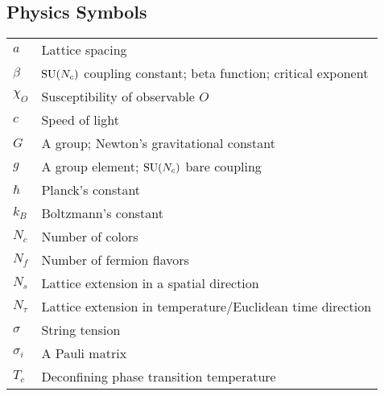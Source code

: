 \documentclass[12pt]{book}
\theoremstyle{definition}
\newenvironment{frontstuff}
  {\centering\chapter*{}}
  {\clearpage}
\begin{document}
\begin{frontstuff}
\section*{Physics Symbols}
\begin{tabular}{ll}
$a$             & Lattice spacing \\
$\beta$         & $\operatorname{SU}(N_c)$ coupling constant; beta function; critical exponent \\
$\chi_O$        & Susceptibility of observable $O$\\
$c$             & Speed of light\\
$G$             & A group; Newton's gravitational constant\\
$g$             & A group element; $\operatorname{SU}(N_c)$ bare coupling\\
$\hbar$         & Planck's constant \\
$k_B$           & Boltzmann's constant \\
$N_c$           & Number of colors \\
$N_f$           & Number of fermion flavors \\
$N_s$           & Lattice extension in a spatial direction \\
$N_\tau$        & Lattice extension in temperature/Euclidean time direction\\
$\sigma$        & String tension\\
$\sigma_i$      & A Pauli matrix\\
$T_c$           & Deconfining phase transition temperature\\
\end{tabular}
\clearpage



\end{frontstuff}
\end{document}
